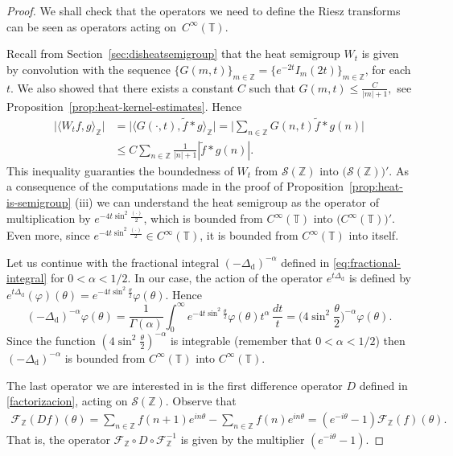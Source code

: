 \documentclass[11pt]{amsart}
\numberwithin{equation}{section}
\newcommand{\Z}{\mathbb{Z}}
\newcommand{\T}{\mathbb{T}}
\newcommand{\dis}{\mathrm{d}}
\theoremstyle{plain}
\theoremstyle{remark}
\begin{document}
\begin{proof}
We shall check that the operators we need to define the Riesz transforms can be seen as operators acting on~$C^\infty(\T)$.

Recall from Section~\ref{sec:disheatsemigroup} that the heat semigroup $W_t$ is given by convolution with the sequence $\{G(m,t)\}_{m\in \Z} = \{e^{-2t} I_m(2t)\}_{m\in \Z}$, for each $t$. We also showed that there exists a constant $C$ such that $G(m,t) \le \frac{C}{|m|+1},$ see  Proposition~\ref{prop:heat-kernel-estimates}. Hence
\begin{align*}
\big| \big \langle W_tf, g\big\rangle_\Z \big|
&= \big| \big\langle G(\cdot,t), \tilde{f}*g\big\rangle_\Z \big|
= \big|\sum_{n\in \Z} G(n,t) \tilde{f}*g(n) \big|\\
&\le C\sum_{n\in\Z} \frac1{|n|+1} |\tilde{f}*g(n)|.
\end{align*}
This inequality guaranties the boundedness of $W_t$ from $\mathcal{S}(\Z)$ into $\big( \mathcal{S}(\Z) \big)'$.  As a consequence of the computations made in the proof of Proposition~\ref{prop:heat-is-semigroup} (iii) we can understand the heat semigroup as the operator of multiplication by $e^{-4t\sin^2 \frac{(\cdot)}{2}}$, which is bounded from $C^\infty(\T)$ into $\big( C^\infty(\T)\big)'$. Even more, since $e^{-4t\sin^2 \frac{(\cdot)}{2}} \in C^\infty(\T)$, it is bounded from $C^\infty(\T)$ into itself.

Let us continue with the fractional integral
$(-\Delta_{\dis})^{-\alpha}$ defined in \eqref{eq:fractional-integral} for $0< \alpha < 1/2$. In our case, the action of the operator  $e^{t\Delta_{\dis}}$ is defined by $e^{t\Delta_{\dis}}(\varphi)(\theta)= e^{-4t\sin^2 \frac{\theta}{2}} \varphi(\theta)$. Hence
\begin{equation*}
(-\Delta_{\dis})^{-\alpha}\varphi(\theta) = \frac1{\Gamma(\alpha)} \int_0^\infty  e^{-4t\sin^2 \frac{\theta}{2}} \varphi(\theta) t^{\alpha}\,\frac{dt}{t}
= \Big(4\sin^2\frac{\theta}{2}\Big)^{-\alpha} \varphi(\theta).
\end{equation*}
Since the function $(4\sin^2\frac{\theta}{2})^{-\alpha}$ is integrable (remember that $0<\alpha < 1/2$) then $(-\Delta_{\dis})^{-\alpha}$ is bounded from
$C^\infty(\T)$ into  $C^\infty(\T).$

The last operator we are interested in is the first difference operator $D$ defined in \eqref{factorizacion}, acting on $\mathcal{S}(\Z)$. Observe that
\begin{align*}
\mathcal{F}_{\Z}(Df)(\theta) = \sum_{n\in\Z} f(n+1) e^{in\theta} -\sum_{n\in\Z} f(n) e^{in\theta}  = (e^{-i\theta}-1) \mathcal{F}_{\Z}(f)(\theta).
\end{align*}
That is, the operator  $\mathcal{F}_{\Z}\circ D \circ \mathcal{F}_{\Z}^{-1}$ is given by the multiplier $(e^{-i\theta}-1)$.


\end{proof}
\end{document}
